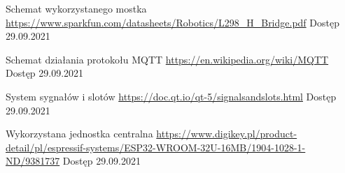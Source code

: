 \begin{thebibliography}{9}
        Schemat wykorzystanego mostka  \newline
        \url{https://www.sparkfun.com/datasheets/Robotics/L298_H_Bridge.pdf} \newline
        Dostęp 29.09.2021
        
        Schemat działania protokołu MQTT  \newline
        \url{https://en.wikipedia.org/wiki/MQTT} \newline
        Dostęp 29.09.2021
        
        System sygnałów i slotów \newline
        \url{https://doc.qt.io/qt-5/signalsandslots.html} \newline
        Dostęp 29.09.2021
        
        Wykorzystana jednostka centralna \newline
        \url{https://www.digikey.pl/product-detail/pl/espressif-systems/ESP32-WROOM-32U-16MB/1904-1028-1-ND/9381737} \newline
        Dostęp 29.09.2021

  \end{thebibliography}
  
  